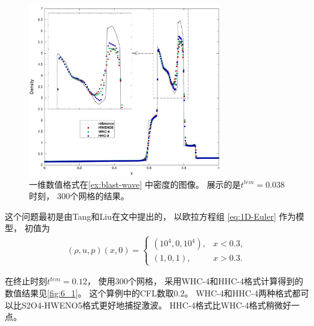 \begin{figure}[htbp]
  \centering
  \includegraphics[width=0.75\textwidth]{fig/1D/Ex5.pdf}
  \caption{一维数值格式在\cref{ex:blast-wave} 中密度的图像。
    展示的是$t^{tem} = 0.038$时刻，
    $300$个网格的结果。
  }
  \label{fig:5_1}
\end{figure}

\begin{example}
  \label{ex:large-ratio}
  这个问题最初是由Tang和Liu在文\cite{LPDRP}中提出的，
  以欧拉方程组 \cref{eq:1D-Euler} 作为模型，
  初值为
  \begin{equation}
    \begin{aligned}
      (\rho, u, p)(x,0)=
      \begin{cases}
        (10^4,0,10^4), & x<0.3,  \\
        (1,0,1),       & x>0.3.
      \end{cases}
    \end{aligned}
  \end{equation}
\end{example}

在终止时刻$t^{tem}=0.12$，
使用$300$个网格，
采用WHC-4和HHC-4格式计算得到的数值结果见\cref{fig:6_1}。
这个算例中的CFL数取$0.2$。
WHC-4和HHC-4两种格式都可以比S2O4-HWENO5格式更好地捕捉激波。
HHC-4格式比WHC-4格式稍微好一点。


